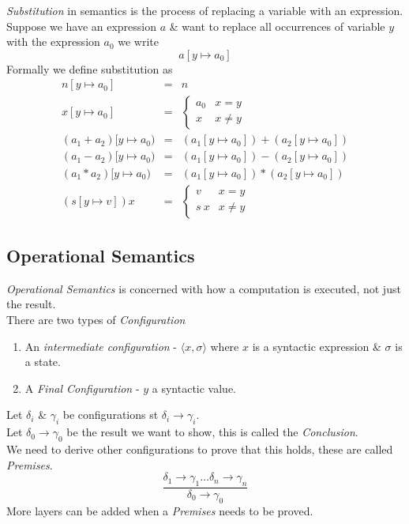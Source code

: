 \documentclass[11pt,a4paper]{article}
\begin{document}
\textit{Substitution} in semantics is the process of replacing a variable with an expression.\\
Suppose we have an expression $a$ \& want to replace all occurrences of variable $y$ with the expression $a_0$ we write
$$a[y\mapsto a_0]$$
Formally we define substitution as
\[\begin{array}{rcl}
n[y\mapsto a_0]&=&n\\
x[y\mapsto a_0]&=&\begin{cases}a_0&x=y\\x&x\neq y\end{cases}\\
(a_1+a_2)[y\mapsto a_0)&=&(a_1[y\mapsto a_0])+(a_2[y\mapsto a_0])\\
(a_1-a_2)[y\mapsto a_0)&=&(a_1[y\mapsto a_0])-(a_2[y\mapsto a_0])\\
(a_1*a_2)[y\mapsto a_0)&=&(a_1[y\mapsto a_0])*(a_2[y\mapsto a_0])\\
(s[y\mapsto v])x&=&\begin{cases}v&x=y\\s\ x&x\neq y\end{cases}
\end{array}\]

\subsection{Operational Semantics}

\textit{Operational Semantics} is concerned with how a computation is executed, not just the result.\\

There are two types of \textit{Configuration}
\begin{enumerate}[label=\roman*)]
	\item An \textit{intermediate configuration} - $\langle x,\sigma\rangle$ where $x$ is a syntactic expression \& $\sigma$ is a state.
	\item A \textit{Final Configuration} - $y$ a syntactic value.
\end{enumerate}

Let $\delta_i$ \& $\gamma_i$ be configurations st $\delta_i\to\gamma_i$.\\
Let $\delta_0\to\gamma_0$ be the result we want to show, this is called the \textit{Conclusion}.\\
We need to derive other configurations to prove that this holds, these are called \textit{Premises}.
$$\dfrac{\delta_1\to\gamma_1\dots\delta_n\to\gamma_n}{\delta_0\to\gamma_0}$$
\NB More layers can be added when a \textit{Premises} needs to be proved.
\end{document}
